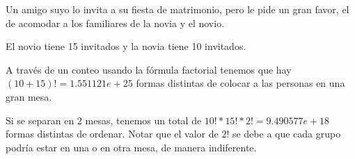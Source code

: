 \addpoints

\question[10] Un amigo suyo lo invita a su fiesta de matrimonio, pero le pide un gran favor, el de acomodar a los familiares de la novia y el novio. 
 
El novio tiene 15 invitados y la novia tiene 10 invitados. 

\noaddpoints
{}

\begin{solution}
A través de un conteo usando la fórmula factorial tenemos que hay $(10+15)!= 1.551121e+25$ formas distintas de colocar a las personas en una gran mesa.

Si se separan en 2 mesas, tenemos un total de $10!*15!*2!= 9.490577e+18$ formas distintas de ordenar. Notar que el valor de $2!$ se debe a que cada grupo podría estar en una o en otra mesa, de manera indiferente.
\end{solution}

